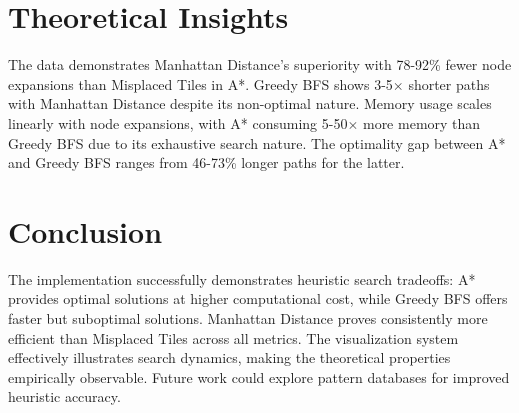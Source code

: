 \documentclass{report}
\begin{document}
\section{Theoretical Insights}
The data demonstrates Manhattan Distance's superiority with 78-92\% fewer node expansions than Misplaced Tiles in A*. Greedy BFS shows 3-5$\times$ shorter paths with Manhattan Distance despite its non-optimal nature. Memory usage scales linearly with node expansions, with A* consuming 5-50$\times$ more memory than Greedy BFS due to its exhaustive search nature. The optimality gap between A* and Greedy BFS ranges from 46-73\% longer paths for the latter.

\section{Conclusion}
The implementation successfully demonstrates heuristic search tradeoffs: A* provides optimal solutions at higher computational cost, while Greedy BFS offers faster but suboptimal solutions. Manhattan Distance proves consistently more efficient than Misplaced Tiles across all metrics. The visualization system effectively illustrates search dynamics, making the theoretical properties empirically observable. Future work could explore pattern databases for improved heuristic accuracy.
\end{document}
